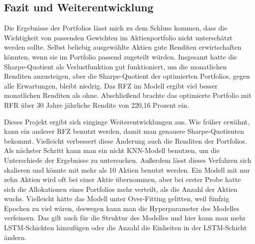 \documentclass[12pt]{article}
\begin{document}
        
        \subsection{Fazit und Weiterentwicklung}

        Die Ergebnisse der Portfolios lässt mich zu dem Schluss kommen, 
        dass die Wichtigkeit von passenden Gewichten im Aktienportfolio nicht unterschätzt werden sollte. 
        Selbst beliebig ausgewählte Aktien gute Renditen erwirtschaften könnten, wenn sie im Portfolio passend zugeteilt würden. 
        Insgesamt hatte die Sharpe-Quotient als Verlustfunktion gut funktioniert, um die monatlichen Renditen anzusteigen, 
        aber die Sharpe-Quotient der optimierten Portfolios, gegen alle Erwartungen, bleibt niedrig. 
        Das RFZ im Modell ergibt viel besser monatlichen Renditen als ohne. 
        Abschließend brachte das optimierte Portfolio mit RFR über 30 Jahre jährliche Rendite von 220,16 Prozent ein.

        Dieses Projekt ergibt sich einginge Weiterentwicklungen aus. Wie früher erwähnt, kann ein anderer RFZ benutzt werden,
        damit man genauere Sharpe-Quotienten bekommt. Vielleicht verbessert diese Änderung auch die Renditen der Portfolios.
        Als nächster Schritt kann man ein nicht KNN-Modell benutzen, um die Unterschiede der Ergebnisse zu untersuchen. 
        Außerdem lässt dieses Verfahren sich skalieren und könnte mit mehr als 10 Aktien benutzt werden. 
        Ein Modell mit nur zehn Aktien wird oft bei einer Aktie übernommen, 
        aber bei erster Probe hatte sich die Allokationen eines Portfolios mehr verteilt, als die Anzahl der Aktien wuchs. 
        Vielleicht hätte das Modell unter Over-Fitting gelitten, weil fünfzig Epochen zu viel wären, 
        deswegen kann man die Hyperparameter des Modelles verfeinern. 
        Das gilt auch für die Struktur des Modelles und hier kann man mehr LSTM-Schichten hinzufügen oder 
        die Anzahl die Einheiten in der LSTM-Schicht ändern.
    
    
    \printbibliography[heading=bibintoc, title={Literaturverzeichnis}]
\end{document}
